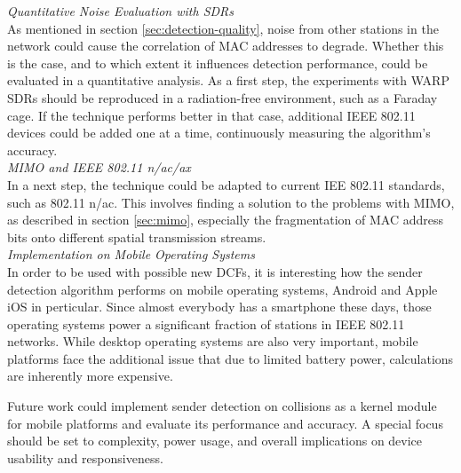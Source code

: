 \textit{Quantitative Noise Evaluation with SDRs}\\

As mentioned in section \ref{sec:detection-quality}, noise from other stations in the network could cause the correlation of MAC addresses to degrade. Whether this is the case, and to which extent it influences detection performance, could be evaluated in a quantitative analysis. As a first step, the experiments with \gls{WARP} \glspl{SDR} should be reproduced in a radiation-free environment, such as a Faraday cage. If the technique performs better in that case, additional IEEE 802.11 devices could be added one at a time, continuously measuring the algorithm's accuracy.\\

\textit{MIMO and IEEE 802.11 n/ac/ax}\\

In a next step, the technique could be adapted to current IEE 802.11 standards, such as 802.11 n/ac. This involves finding a solution to the problems with \gls{MIMO}, as described in section \ref{sec:mimo}, especially the fragmentation of MAC address bits onto different spatial transmission streams.\\

\textit{Implementation on Mobile Operating Systems}\\

In order to be used with possible new \glspl{DCF}, it is interesting how the sender detection algorithm performs on mobile operating systems, Android and Apple iOS in perticular. Since almost everybody has a smartphone these days, those operating systems power a significant fraction of stations in IEEE 802.11 networks. While desktop operating systems are also very important, mobile platforms face the additional issue that due to limited battery power, calculations are inherently more expensive.

Future work could implement sender detection on collisions as a kernel module for mobile platforms and evaluate its performance and accuracy. A special focus should be set to complexity, power usage, and overall implications on device usability and responsiveness.
